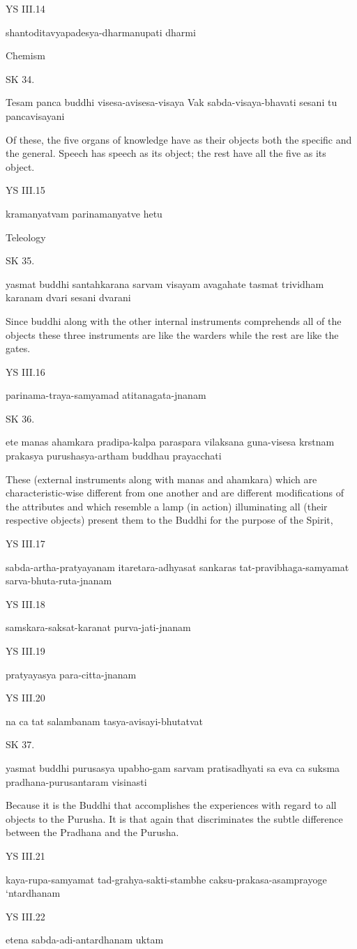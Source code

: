 YS III.14

    shantoditavyapadesya-dharmanupati dharmi

    Chemism

SK 34.

Tesam panca buddhi visesa-avisesa-visaya
Vak sabda-visaya-bhavati sesani tu pancavisayani

Of these, the five organs of knowledge have as their objects
both the specific and the general.
Speech has speech as its object;
the rest have all the five as its object.

YS III.15

    kramanyatvam parinamanyatve hetu

    Teleology

SK 35.


yasmat buddhi santahkarana sarvam visayam avagahate
tasmat trividham karanam dvari sesani dvarani

Since buddhi along with the other internal instruments
comprehends all of the objects these three instruments are
like the warders while the rest are like the gates.

YS III.16

    parinama-traya-samyamad atitanagata-jnanam

SK 36.

ete manas ahamkara pradipa-kalpa paraspara vilaksana
guna-visesa krstnam prakasya purushasya-artham buddhau prayacchati

These (external instruments along with manas and ahamkara)
which are characteristic-wise different from one another
and are different modifications of the attributes
and which resemble a lamp (in action) illuminating all (their respective objects)
present them to the Buddhi for the purpose of the Spirit,

YS III.17

    sabda-artha-pratyayanam itaretara-adhyasat sankaras tat-pravibhaga-samyamat sarva-bhuta-ruta-jnanam

YS III.18

    samskara-saksat-karanat purva-jati-jnanam

YS III.19

    pratyayasya para-citta-jnanam

YS III.20

    na ca tat salambanam tasya-avisayi-bhutatvat

SK 37.

yasmat buddhi purusasya upabho-gam sarvam pratisadhyati
sa eva ca suksma pradhana-purusantaram visinasti

Because it is the Buddhi that accomplishes the experiences
with regard to all objects to the Purusha.
It is that again that discriminates the subtle difference
between the Pradhana and the Purusha.

YS III.21

    kaya-rupa-samyamat tad-grahya-sakti-stambhe caksu-prakasa-asamprayoge ‘ntardhanam

YS III.22

    etena sabda-adi-antardhanam uktam
